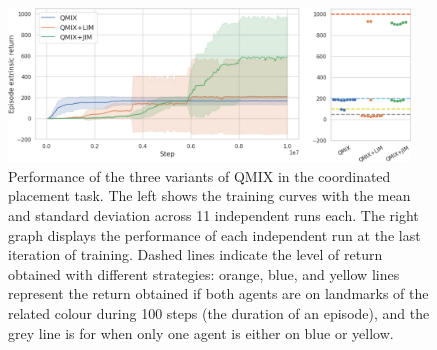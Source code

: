 \begin{figure}[t]
    \centering
    \includegraphics[width=0.95\textwidth]{Figures/JIM/coord_placeR.png}
    \caption{Performance of the three variants of QMIX in the coordinated placement task. The left shows the training curves with the mean and standard deviation across 11 independent runs each. The right graph displays the performance of each independent run at the last iteration of training. Dashed lines indicate the level of return obtained with different strategies: orange, blue, and yellow lines represent the return obtained if both agents are on landmarks of the related colour during 100 steps (the duration of an episode), and the grey line is for when only one agent is either on blue or yellow.}
    \label{fig:JIM:coordplace_results}
\end{figure}

